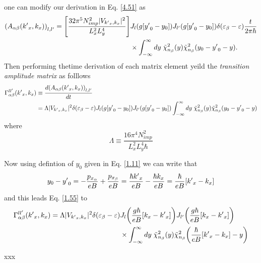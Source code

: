 one can modify our derivation in Eq. \eqref{4.51} as
\begin{equation} \label{4.53}
  \begin{aligned}
      \qty(A_{\alpha\beta}({k'}_x,k_x))_{l,l'} =
      \qty[\frac { 32\pi^5 N_{imp}^2 |V_{{k'}_x,k_x}|^2}{L_x^2 L_y^4}] &
      J_l\qty(g[{y'}_0 - y_0]) J_{l'}\qty(g[{y'}_0 - y_0])
      \delta(\varepsilon_{\beta} - \varepsilon)
      \frac{t}{2\pi \hbar}\\
      & \times
      \int_{-\infty}^{\infty} dy \;
      \tilde{\chi}^2_{n_{\beta}}\qty(y)
      \tilde{\chi}^2_{n_{\beta}}\qty(y_0 - {y'}_0 - y).
  \end{aligned}
\end{equation}
Then performing thetime derivation of each matrix element yeild the \textit{transition amplitude matrix} as folllows
\begin{equation} \label{4.54}
  \begin{aligned}
    \Gamma_{\alpha\beta}^{ll'}({k'}_x,k_x) &  \equiv
    \frac{d \qty(A_{\alpha\beta}({k'}_x,k_x))_{l,l'}}{dt} \\
    & =
    \Lambda |V_{{k'}_x,k_x}|^2
    \delta(\varepsilon_{\beta} - \varepsilon)
    J_l\qty(g[{y'}_0 - y_0]) J_{l'}\qty(g[{y'}_0 - y_0])
    \int_{-\infty}^{\infty} dy \;
    \tilde{\chi}^2_{n_{\beta}}\qty(y)
    \tilde{\chi}^2_{n_{\beta}}\qty(y_0 - {y'}_0 - y)
  \end{aligned}
\end{equation}
where
\begin{equation} \label{4.55}
    \Lambda \equiv
    \frac { 16\pi^4 N_{imp}^2}{L_x^2 L_y^4 \hbar}
\end{equation}

\noindent
Now using defintion of $y_0$ given in Eq. \eqref{1.11} we can write that
\begin{equation} \label{4.56}
    y_0 - {y'}_0 =
    - \frac{p_{x_{\alpha}}}{eB} + \frac{p_{x_{\beta}}}{eB} =
    \frac{\hbar {k'}_x}{eB} - \frac{\hbar {k}_x}{eB} =
    \frac{\hbar}{eB} \qty[{k'}_x - {k}_x]
\end{equation}
and this leads Eq. \eqref{1.55} to
\begin{equation} \label{4.54}
  \begin{aligned}
    \Gamma_{\alpha\beta}^{ll'}({k'}_x,k_x) =
    \Lambda |V_{{k'}_x,k_x}|^2
    \delta(\varepsilon_{\beta} - \varepsilon) &
    J_l\qty(\frac{g\hbar}{eB}[{k}_x - {k'}_x])
    J_{l'}\qty(\frac{g\hbar}{eB}[{k}_x - {k'}_x]) \\
    & \times
    \int_{-\infty}^{\infty} dy \;
    \tilde{\chi}^2_{n_{\beta}}\qty(y)
    \tilde{\chi}^2_{n_{\beta}}\qty(\frac{\hbar}{eB} \qty[{k'}_x - {k}_x] - y)
  \end{aligned}
\end{equation}


















xxx
